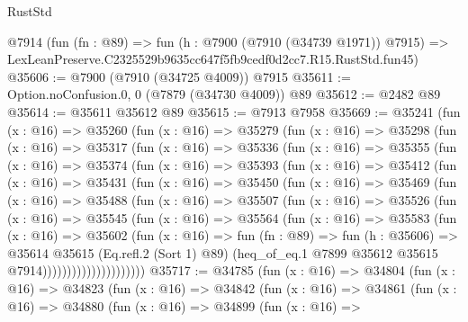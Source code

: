 \begin{lexlean}{RustStd}
\begin{coremodule}
    @7914
    (fun (fn : @89) =>
    fun (h : @7900 (@7910 (@34739 @1971)) @7915) =>
    LexLeanPreserve.C2325529b9635cc647f5fb9cedf0d2cc7.R15.RustStd.fun45)
@35606 := @7900 (@7910 (@34725 @4009)) @7915
@35611 := Option.noConfusion.{0, 0} (@7879 (@34730 @4009)) @89
@35612 := @2482 @89
@35614 := @35611 @35612 @89
@35615 := @7913 @7958
@35669 := @35241
    (fun (x : @16) =>
    @35260
      (fun (x : @16) =>
      @35279
        (fun (x : @16) =>
        @35298
          (fun (x : @16) =>
          @35317
            (fun (x : @16) =>
            @35336
              (fun (x : @16) =>
              @35355
                (fun (x : @16) =>
                @35374
                  (fun (x : @16) =>
                  @35393
                    (fun (x : @16) =>
                    @35412
                      (fun (x : @16) =>
                      @35431
                        (fun (x : @16) =>
                        @35450
                          (fun (x : @16) =>
                          @35469
                            (fun (x : @16) =>
                            @35488
                              (fun (x : @16) =>
                              @35507
                                (fun (x : @16) =>
                                @35526
                                  (fun (x : @16) =>
                                  @35545
                                    (fun (x : @16) =>
                                    @35564
                                      (fun (x : @16) =>
                                      @35583
                                        (fun (x : @16) =>
                                        @35602
                                          (fun (x : @16) =>
                                          fun (fn : @89) =>
                                          fun (h : @35606) =>
                                          @35614
                                            @35615
                                            (Eq.refl.{2} (Sort 1) @89)
                                            (heq_of_eq.{1}
                                              @7899
                                              @35612
                                              @35615
                                              @7914)))))))))))))))))))))
@35717 := @34785
    (fun (x : @16) =>
    @34804
      (fun (x : @16) =>
      @34823
        (fun (x : @16) =>
        @34842
          (fun (x : @16) =>
          @34861
            (fun (x : @16) =>
            @34880
              (fun (x : @16) =>
              @34899
                (fun (x : @16) =>

\end{coremodule}
\end{lexlean}
